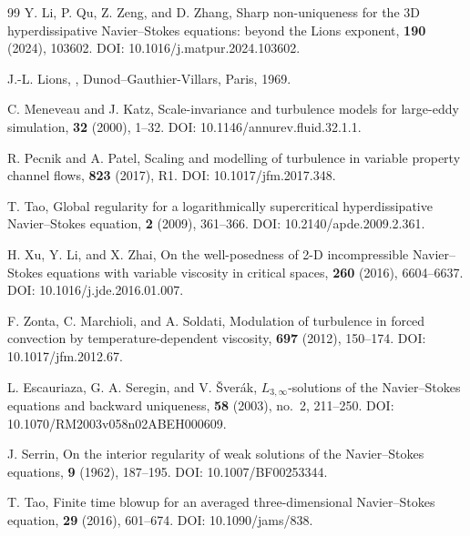 \documentclass[11pt]{article}
\theoremstyle{definition}
\theoremstyle{remark}
\begin{document}
\begin{thebibliography}{99}
Y. Li, P. Qu, Z. Zeng, and D. Zhang,
\newblock Sharp non-uniqueness for the 3D hyperdissipative Navier--Stokes equations: beyond the Lions exponent,
 \textbf{190} (2024), 103602.
\newblock DOI: 10.1016/j.matpur.2024.103602.

J.-L. Lions,
,
\newblock Dunod--Gauthier-Villars, Paris, 1969.

C. Meneveau and J. Katz,
\newblock Scale-invariance and turbulence models for large-eddy simulation,
 \textbf{32} (2000), 1--32.
\newblock DOI: 10.1146/annurev.fluid.32.1.1.

R. Pecnik and A. Patel,
\newblock Scaling and modelling of turbulence in variable property channel flows,
 \textbf{823} (2017), R1.
\newblock DOI: 10.1017/jfm.2017.348.

T. Tao,
\newblock Global regularity for a logarithmically supercritical hyperdissipative Navier--Stokes equation,
 \textbf{2} (2009), 361--366.
\newblock DOI: 10.2140/apde.2009.2.361.

H. Xu, Y. Li, and X. Zhai,
\newblock On the well-posedness of 2-D incompressible Navier--Stokes equations with variable viscosity in critical spaces,
 \textbf{260} (2016), 6604--6637.
\newblock DOI: 10.1016/j.jde.2016.01.007.

F. Zonta, C. Marchioli, and A. Soldati,
\newblock Modulation of turbulence in forced convection by temperature-dependent viscosity,
 \textbf{697} (2012), 150--174.
\newblock DOI: 10.1017/jfm.2012.67.


L. Escauriaza, G. A. Seregin, and V. \v Sver\'ak,
\newblock $L_{3,\infty}$-solutions of the Navier--Stokes equations and backward uniqueness,
 \textbf{58} (2003), no.~2, 211--250.
\newblock DOI: 10.1070/RM2003v058n02ABEH000609.

J. Serrin,
\newblock On the interior regularity of weak solutions of the Navier--Stokes equations,
 \textbf{9} (1962), 187--195.
\newblock DOI: 10.1007/BF00253344.

T. Tao,
\newblock Finite time blowup for an averaged three-dimensional Navier--Stokes equation,
 \textbf{29} (2016), 601--674.
\newblock DOI: 10.1090/jams/838.

\end{thebibliography}
\end{document}
